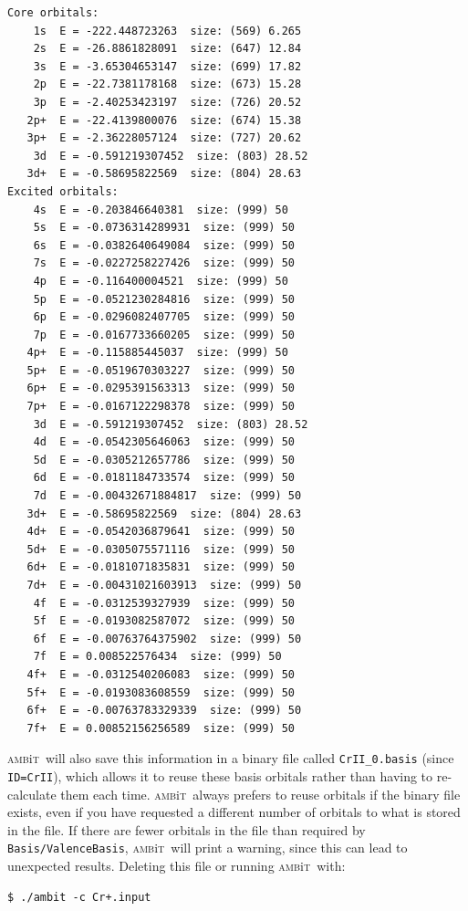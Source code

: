 \documentclass{report}
\newcommand{\ambit}{\textsc{amb}{\footnotesize i}\textsc{t}}
\begin{document}
\begin{verbatim}
Core orbitals: 
    1s  E = -222.448723263  size: (569) 6.265
    2s  E = -26.8861828091  size: (647) 12.84
    3s  E = -3.65304653147  size: (699) 17.82
    2p  E = -22.7381178168  size: (673) 15.28
    3p  E = -2.40253423197  size: (726) 20.52
   2p+  E = -22.4139800076  size: (674) 15.38
   3p+  E = -2.36228057124  size: (727) 20.62
    3d  E = -0.591219307452  size: (803) 28.52
   3d+  E = -0.58695822569  size: (804) 28.63
Excited orbitals: 
    4s  E = -0.203846640381  size: (999) 50
    5s  E = -0.0736314289931  size: (999) 50
    6s  E = -0.0382640649084  size: (999) 50
    7s  E = -0.0227258227426  size: (999) 50
    4p  E = -0.116400004521  size: (999) 50
    5p  E = -0.0521230284816  size: (999) 50
    6p  E = -0.0296082407705  size: (999) 50
    7p  E = -0.0167733660205  size: (999) 50
   4p+  E = -0.115885445037  size: (999) 50
   5p+  E = -0.0519670303227  size: (999) 50
   6p+  E = -0.0295391563313  size: (999) 50
   7p+  E = -0.0167122298378  size: (999) 50
    3d  E = -0.591219307452  size: (803) 28.52
    4d  E = -0.0542305646063  size: (999) 50
    5d  E = -0.0305212657786  size: (999) 50
    6d  E = -0.0181184733574  size: (999) 50
    7d  E = -0.00432671884817  size: (999) 50
   3d+  E = -0.58695822569  size: (804) 28.63
   4d+  E = -0.0542036879641  size: (999) 50
   5d+  E = -0.0305075571116  size: (999) 50
   6d+  E = -0.0181071835831  size: (999) 50
   7d+  E = -0.00431021603913  size: (999) 50
    4f  E = -0.0312539327939  size: (999) 50
    5f  E = -0.0193082587072  size: (999) 50
    6f  E = -0.00763764375902  size: (999) 50
    7f  E = 0.008522576434  size: (999) 50
   4f+  E = -0.0312540206083  size: (999) 50
   5f+  E = -0.0193083608559  size: (999) 50
   6f+  E = -0.00763783329339  size: (999) 50
   7f+  E = 0.00852156256589  size: (999) 50
\end{verbatim}

\ambit\  will also save this information in a binary file called \texttt{CrII\_0.basis} (since
\texttt{ID=CrII}), which allows it to reuse these basis orbitals rather than having to re-calculate them
each time. \ambit\  always prefers to reuse orbitals if the binary file exists, even if you have
requested a different number of orbitals to what is stored in the file. If there are fewer orbitals in
the file than required by \texttt{Basis/ValenceBasis}, \ambit\  will print a warning, since this can lead
to unexpected results. Deleting this file or running \ambit\  with:

\begin{verbatim}
$ ./ambit -c Cr+.input
\end{verbatim}
\end{document}
